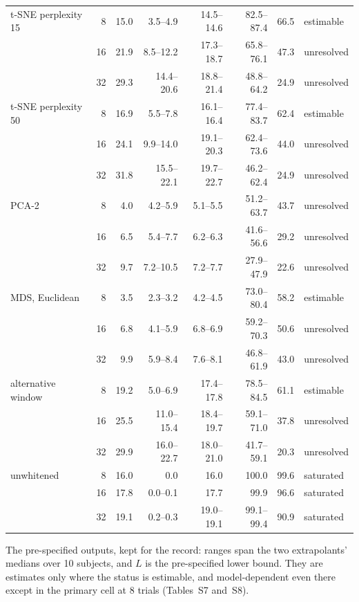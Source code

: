 \documentclass[11pt]{article}
\newcommand{\tablenote}[1]{\par\smallskip\noindent
  \begin{minipage}{\linewidth}\footnotesize\setlength{\parindent}{0pt}#1\end{minipage}}
\begin{document}
\begin{table}[!htb]
\begin{tabular}{lrrrrrrl}
\addlinespace
t-SNE perplexity 15 & 8 & 15.0 & 3.5--4.9 & 14.5--14.6 & 82.5--87.4 & 66.5 & estimable \\
 & 16 & 21.9 & 8.5--12.2 & 17.3--18.7 & 65.8--76.1 & 47.3 & unresolved \\
 & 32 & 29.3 & 14.4--20.6 & 18.8--21.4 & 48.8--64.2 & 24.9 & unresolved \\
\addlinespace
t-SNE perplexity 50 & 8 & 16.9 & 5.5--7.8 & 16.1--16.4 & 77.4--83.7 & 62.4 & estimable \\
 & 16 & 24.1 & 9.9--14.0 & 19.1--20.3 & 62.4--73.6 & 44.0 & unresolved \\
 & 32 & 31.8 & 15.5--22.1 & 19.7--22.7 & 46.2--62.4 & 24.9 & unresolved \\
\addlinespace
PCA-2 & 8 & 4.0 & 4.2--5.9 & 5.1--5.5 & 51.2--63.7 & 43.7 & unresolved \\
 & 16 & 6.5 & 5.4--7.7 & 6.2--6.3 & 41.6--56.6 & 29.2 & unresolved \\
 & 32 & 9.7 & 7.2--10.5 & 7.2--7.7 & 27.9--47.9 & 22.6 & unresolved \\
\addlinespace
MDS, Euclidean & 8 & 3.5 & 2.3--3.2 & 4.2--4.5 & 73.0--80.4 & 58.2 & estimable \\
 & 16 & 6.8 & 4.1--5.9 & 6.8--6.9 & 59.2--70.3 & 50.6 & unresolved \\
 & 32 & 9.9 & 5.9--8.4 & 7.6--8.1 & 46.8--61.9 & 43.0 & unresolved \\
\addlinespace
alternative window & 8 & 19.2 & 5.0--6.9 & 17.4--17.8 & 78.5--84.5 & 61.1 & estimable \\
 & 16 & 25.5 & 11.0--15.4 & 18.4--19.7 & 59.1--71.0 & 37.8 & unresolved \\
 & 32 & 29.9 & 16.0--22.7 & 18.0--21.0 & 41.7--59.1 & 20.3 & unresolved \\
\addlinespace
unwhitened & 8 & 16.0 & 0.0 & 16.0 & 100.0 & 99.6 & saturated \\
 & 16 & 17.8 & 0.0--0.1 & 17.7 & 99.9 & 96.6 & saturated \\
 & 32 & 19.1 & 0.2--0.3 & 19.0--19.1 & 99.1--99.4 & 90.9 & saturated \\
\bottomrule
\end{tabular}
\tablenote{The pre-specified outputs, kept for the record: ranges span the two extrapolants' medians over 10 subjects, and $L$ is the pre-specified lower bound.
They are estimates only where the status is estimable, and model-dependent even there except in the primary cell at 8 trials (Tables~S7 and~S8).}
\end{table}
\end{document}
